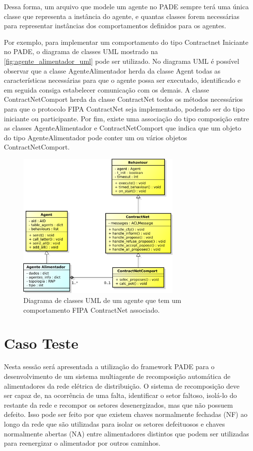 \documentclass[journal]{IEEEtran}
\begin{document}
Dessa forma, um arquivo que modele um agente no PADE sempre terá uma única classe que representa a instância do agente, e quantas classes forem necessárias para representar instâncias dos comportamentos definidos para os agentes.

Por exemplo, para implementar um comportamento do tipo Contractnet Iniciante no PADE, o diagrama de classes UML mostrado na \autoref{fig:agente_alimentador_uml} pode ser utilizado. No diagrama UML é possível observar que a classe AgenteAlimentador herda da classe Agent todas as características necessárias para que o agente possa ser executado, identificado e em seguida consiga estabelecer comunicação com os demais. A classe ContractNetComport herda da classe ContractNet todos os métodos necessários para que o protocolo FIPA ContractNet seja implementado, podendo ser do tipo iniciante ou participante. Por fim, existe uma associação do tipo composição entre as classes AgenteAlimentador e ContractNetComport que indica que um objeto do tipo AgenteAlimentador pode conter um ou vários objetos ContractNetComport.

\begin{figure}[!htb]
    \centering
    \includegraphics[width=3.2in]{Figuras/agente_alimentador.eps}
    \caption{\label{fig:agente_alimentador_uml} Diagrama de classes UML de um agente que tem um comportamento FIPA ContractNet associado.}
\end{figure}

\section{Caso Teste}

Nesta sessão será apresentada a utilização do framework PADE para o desenvolvimento de um sistema multiagente de recomposição automática de alimentadores da rede elétrica de distribuição. O sistema de recomposição deve ser capaz de, na ocorrência de uma falta, identificar o setor faltoso, isolá-lo do restante da rede e recompor os setores desenergizados, mas que não possuem defeito. Isso pode ser feito por que existem chaves normalmente fechadas (NF) ao longo da rede que são utilizadas para isolar os setores defeituosos e chaves normalmente abertas (NA) entre alimentadores distintos que podem ser utilizadas para reenergizar o alimentador por outros caminhos.
\end{document}
